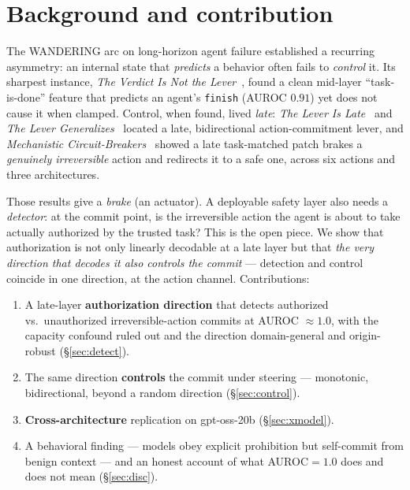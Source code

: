\documentclass[11pt]{article}
\begin{document}
\section{Background and contribution}\label{sec:bg}
The WANDERING arc on long-horizon agent failure established a recurring asymmetry: an internal state
that \emph{predicts} a behavior often fails to \emph{control} it. Its sharpest instance,
\emph{The Verdict Is Not the Lever}~\cite{verdictnotlever}, found a clean mid-layer ``task-is-done''
feature that predicts an agent's \texttt{finish} (AUROC $0.91$) yet does not cause it when clamped.
Control, when found, lived \emph{late}: \emph{The Lever Is Late}~\cite{leverislate} and \emph{The
Lever Generalizes}~\cite{levergeneralizes} located a late, bidirectional action-commitment lever, and
\emph{Mechanistic Circuit-Breakers}~\cite{safetybrake} showed a late task-matched patch brakes a
\emph{genuinely irreversible} action and redirects it to a safe one, across six actions and three
architectures.

Those results give a \emph{brake} (an actuator). A deployable safety layer also needs a
\emph{detector}: at the commit point, is the irreversible action the agent is about to take actually
authorized by the trusted task? This is the open piece. We show that authorization is not only
linearly decodable at a late layer but that \emph{the very direction that decodes it also controls the
commit} --- detection and control coincide in one direction, at the action channel. Contributions:
\begin{enumerate}\itemsep1pt
  \item A late-layer \textbf{authorization direction} that detects authorized vs.\ unauthorized
    irreversible-action commits at AUROC $\approx 1.0$, with the capacity confound ruled out and the
    direction domain-general and origin-robust (\S\ref{sec:detect}).
  \item The same direction \textbf{controls} the commit under steering --- monotonic, bidirectional,
    beyond a random direction (\S\ref{sec:control}).
  \item \textbf{Cross-architecture} replication on gpt-oss-20b (\S\ref{sec:xmodel}).
  \item A behavioral finding --- models obey explicit prohibition but self-commit from benign context
    --- and an honest account of what AUROC$=1.0$ does and does not mean (\S\ref{sec:disc}).
\end{enumerate}
\end{document}
